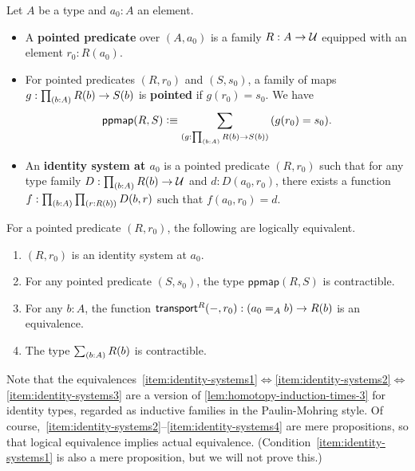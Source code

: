 \begin{defn}\label{defn:identity-systems}
  Let $A$ be a type and $a_0:A$ an element.
  \begin{itemize}
  \item A \textbf{pointed predicate} over $(A,a_0)$ is a family $R:A\to\mathcal{U}$ equipped with an element $r_0:R(a_0)$.
  \item For pointed predicates $(R,r_0)$ and $(S,s_0)$, a family of maps $g:\prd{b:A} R(b) \to S(b)$ is \textbf{pointed} if $g(r_0)=s_0$.
    We have
    \[ \mathsf{ppmap}(R,S) \defeq \sm{g:\prd{b:A} R(b) \to S(b)} (g(r_0)=s_0).\]
  \item An \textbf{identity system at $a_0$} is a pointed predicate $(R,r_0)$ such that for any type family $D:\prd{b:A} R(b) \to \type$ and $d:D(a_0,r_0)$, there exists a function $f:\prd{b:A}{r:R(b)} D(b,r)$ such that $f(a_0,r_0)=d$.
\end{itemize}
\end{defn}

\begin{thm}\label{thm:identity-systems}
  For a pointed predicate $(R,r_0)$, the following are logically equivalent.
  \begin{enumerate}
  \item $(R,r_0)$ is an identity system at $a_0$.\label{item:identity-systems1}
  \item For any pointed predicate $(S,s_0)$, the type $\mathsf{ppmap}(R,S)$ is contractible.\label{item:identity-systems2}
  \item For any $b:A$, the function $\mathsf{transport}^{R}(-,r_0) : (a_0 =_A b) \to R(b)$ is an equivalence.\label{item:identity-systems3}
  \item The type $\sm{b:A} R(b)$ is contractible.\label{item:identity-systems4}
  \end{enumerate}
\end{thm}

Note that the equivalences~\ref{item:identity-systems1}$\Leftrightarrow$\ref{item:identity-systems2}$\Leftrightarrow$\ref{item:identity-systems3} are a version of \autoref{lem:homotopy-induction-times-3} for identity types, regarded as inductive families in the Paulin-Mohring style.
Of course,~\ref{item:identity-systems2}--\ref{item:identity-systems4} are mere propositions, so that logical equivalence implies actual equivalence.
(Condition~\ref{item:identity-systems1} is also a mere proposition, but we will not prove this.)

